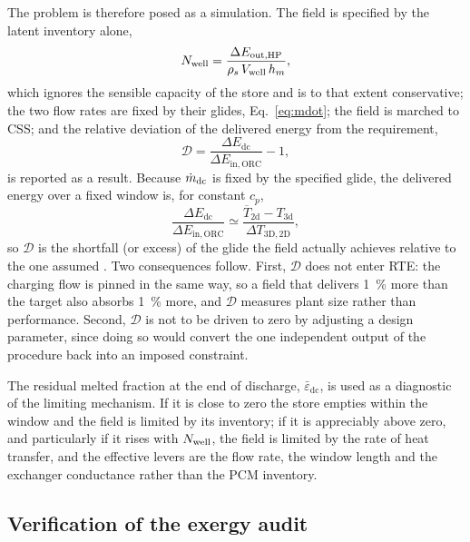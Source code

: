 The problem is therefore posed as a simulation. The field is specified by the
latent inventory alone,
\begin{equation}
  N_{\mathrm{well}}=\frac{\Delta E_\mathrm{out,HP}}{\rho_s\,V_{\mathrm{well}}\,h_{m}},
  \label{eq:Nwell}
\end{equation}
which ignores the sensible capacity of the store and is to that extent
conservative; the two flow rates are fixed by their glides,
Eq.~\eqref{eq:mdot}; the field is marched to CSS; and the relative deviation
of the delivered energy from the requirement,
\begin{equation}
  \mathcal{D}=\frac{\Delta E_\mathrm{dc}}{\Delta E_\mathrm{in,ORC}}-1,
  \label{eq:deviation}
\end{equation}
is reported as a result. Because $\dot m_\mathrm{dc}$ is fixed by the specified
glide, the delivered energy over a fixed window is, for constant $c_p$,
\begin{equation}
  \frac{\Delta E_\mathrm{dc}}{\Delta E_\mathrm{in,ORC}}
  \simeq\frac{\overline{T}_\mathrm{2d}-T_\mathrm{3d}}{\Delta T_\mathrm{3D,2D}},
  \label{eq:glide-shortfall}
\end{equation}
so $\mathcal{D}$ is the shortfall (or excess) of the glide the field actually
achieves relative to the one assumed . Two consequences
follow. First, $\mathcal{D}$ does not enter RTE: the charging flow is pinned
in the same way, so a field that delivers \SI{1}{\percent} more than the
target also absorbs \SI{1}{\percent} more, and $\mathcal{D}$ measures plant
size rather than performance. Second, $\mathcal{D}$ is not to be driven to
zero by adjusting a design parameter, since doing so would convert the one
independent output of the procedure back into an imposed constraint.

The residual melted fraction at the end of discharge,
$\bar\varepsilon_\mathrm{dc}$, is used as a diagnostic of the limiting
mechanism. If it is close to zero the store empties within the window and the
field is limited by its inventory; if it is appreciably above zero, and
particularly if it rises with $N_{\mathrm{well}}$, the field is limited by the rate of heat
transfer, and the effective levers are the flow rate, the window length and
the exchanger conductance rather than the PCM inventory.

\subsection{Verification of the exergy audit}
\label{sec:ex-verification}

